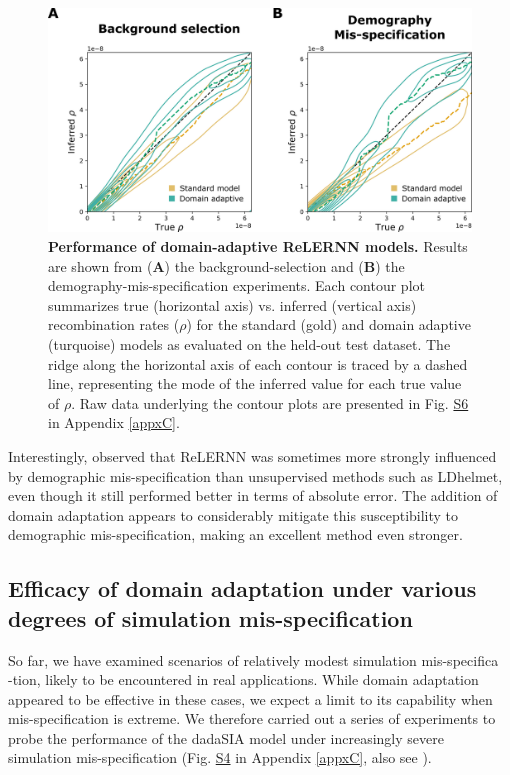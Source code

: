 \begin{figure}[h]
    \centering
    \includegraphics[width=\textwidth]{DA_figs/DA_F4.PNG}
    \caption[Performance of domain-adaptive ReLERNN models.]{\textbf{Performance of domain-adaptive ReLERNN models.} Results are shown from (\textbf{A}) the background-selection and (\textbf{B}) the demography-mis-specification experiments. Each contour plot summarizes true (horizontal axis) vs. inferred (vertical axis) recombination rates ($\rho$) for the standard (gold) and domain adaptive (turquoise) models as evaluated on the held-out test dataset. The ridge along the horizontal axis of each contour is traced by a dashed line, representing the mode of the inferred value for each true value of $\rho$. Raw data underlying the contour plots are presented in Fig. \href{https://journals.plos.org/plosgenetics/article?id=10.1371/journal.pgen.1011032\#sec018}{S6} in Appendix \ref{appxC}.}
    \label{fig:DA-F4}
\end{figure}

Interestingly, \cite{adrion_predicting_2020} observed that ReLERNN was sometimes more strongly influenced by demographic mis-specification than unsupervised methods such as LDhelmet, even though it still performed better in terms of absolute error. The addition of domain adaptation appears to considerably mitigate this susceptibility to demographic mis-specification, making an excellent method even stronger.

\subsection{Efficacy of domain adaptation under various degrees of simulation mis-specification}
So far, we have examined scenarios of relatively modest simulation mis-specifica\\-tion, likely to be encountered in real applications. While domain adaptation appeared to be effective in these cases, we expect a limit to its capability when mis-specification is extreme. We therefore carried out a series of experiments to probe the performance of the \ac{dadaSIA} model under increasingly severe simulation mis-specification (Fig. \href{https://journals.plos.org/plosgenetics/article?id=10.1371/journal.pgen.1011032#sec018}{S4} in Appendix \ref{appxC}, also see ).

